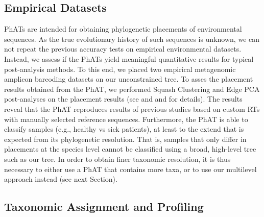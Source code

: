 
\subsection{Empirical Datasets}
\label{sec:Results:sub:EmpiricalDatasets}

\acp{PhAT} are intended for obtaining phylogenetic placements of environmental sequences.
As the true evolutionary history of such sequences is unknown,
we can not repeat the previous accuracy tests on empirical environmental datasets.
Instead, we assess if the \acp{PhAT} yield meaningful quantitative results for typical post-analysis methods.
To this end, we placed two empirical metagenomic amplicon barcoding datasets on our unconstrained  tree.
To asses the placement results obtained from the \ac{PhAT},
we performed Squash Clustering and Edge PCA \citep{Matsen2011a} post-analyses on the placement results
(see  and
 and  for details).
The results reveal that the \ac{PhAT} reproduces results of previous studies
based on custom \acp{RT} with manually selected reference sequences.
Furthermore, the \ac{PhAT} is able to classify samples (e.g., healthy vs sick patients),
at least to the extend that is expected from its phylogenetic resolution.
That is, samples that only differ in placements at the species level
cannot be classified using a broad, high-level tree such as our  tree.
In order to obtain finer taxonomic resolution, it is thus necessary to either use a \ac{PhAT} that contains more taxa,
or to use our multilevel approach instead (see next Section).


\subsection{Taxonomic Assignment and Profiling}
\label{sec:Results:sub:TaxonomicAssignmentProfiling}

